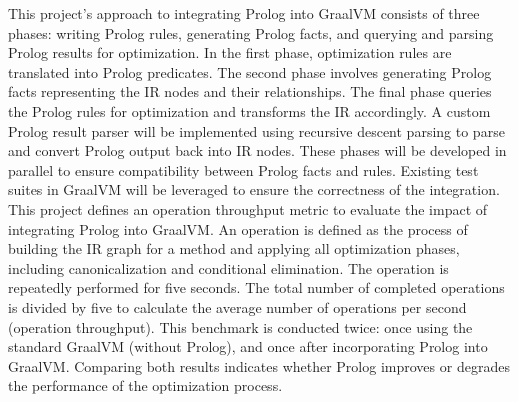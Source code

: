 This project's approach to integrating Prolog into GraalVM consists of three phases: writing Prolog rules, generating Prolog facts, and querying and parsing Prolog results for optimization. In the first phase, optimization rules are translated into Prolog predicates. The second phase involves generating Prolog facts representing the IR nodes and their relationships. The final phase queries the Prolog rules for optimization and transforms the IR accordingly. A custom Prolog result parser will be implemented using recursive descent parsing to parse and convert Prolog output back into IR nodes. These phases will be developed in parallel to ensure compatibility between Prolog facts and rules. Existing test suites in GraalVM will be leveraged to ensure the correctness of the integration.\\

This project defines an operation throughput metric to evaluate the impact of integrating Prolog into GraalVM. An operation is defined as the process of building the IR graph for a method and applying all optimization phases, including canonicalization and conditional elimination. The operation is repeatedly performed for five seconds. The total number of completed operations is divided by five to calculate the average number of operations per second (operation throughput). This benchmark is conducted twice: once using the standard GraalVM (without Prolog), and once after incorporating Prolog into GraalVM. Comparing both results indicates whether Prolog improves or degrades the performance of the optimization process.
